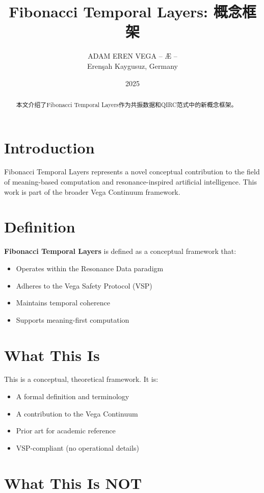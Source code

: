 \documentclass[12pt,a4paper]{article}
\title{Fibonacci Temporal Layers: 概念框架}
\author{ADAM EREN VEGA – Æ –\\\small{Erenşah Kaygusuz, Germany}}
\date{2025}
\begin{document}
\maketitle

\begin{abstract}
本文介绍了Fibonacci Temporal Layers作为共振数据和QIRC范式中的新概念框架。
\end{abstract}

\section{Introduction}

Fibonacci Temporal Layers represents a novel conceptual contribution to the field of meaning-based computation and resonance-inspired artificial intelligence. This work is part of the broader Vega Continuum framework.

\section{Definition}

\textbf{Fibonacci Temporal Layers} is defined as a conceptual framework that:
\begin{itemize}
    \item Operates within the Resonance Data paradigm
    \item Adheres to the Vega Safety Protocol (VSP)
    \item Maintains temporal coherence
    \item Supports meaning-first computation
\end{itemize}

\section{What This Is}

This is a conceptual, theoretical framework. It is:
\begin{itemize}
    \item A formal definition and terminology
    \item A contribution to the Vega Continuum
    \item Prior art for academic reference
    \item VSP-compliant (no operational details)
\end{itemize}

\section{What This Is NOT}
\end{document}
